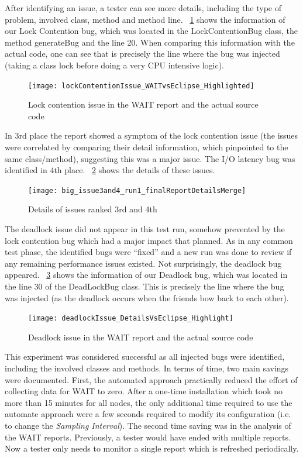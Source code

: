 \documentclass[runningheads,a4paper]{llncs}
\begin{document}
After identifying an issue, a tester can see more details, including the type of
problem, involved class, method and method line. \figurename
~\ref{fig_issue2_vs_code} shows the information of our Lock Contention bug,
which was located in the LockContentionBug class, the method generateBug and the
line 20. When comparing this information with the actual code, one can see that
is precisely the line where the bug was injected (taking a class lock before
doing a very CPU intensive logic).

\begin{figure}[!h]
\centering
\texttt{[image: lockContentionIssue\_WAITvsEclipse\_Highlighted]}
\caption{Lock contention issue in the WAIT report and the actual source code}
\label{fig_issue2_vs_code}
\end{figure}

In 3rd place the report showed a symptom of the lock contention issue
(the issues were correlated by comparing their detail information, which
pinpointed to the same class/method), suggesting this was a major issue. The I/O
latency bug was identified in 4th place. \figurename ~\ref{fig_issues34} shows
the details of these issues.

\begin{figure}[!h]
\centering
\texttt{[image: big\_issue3and4\_run1\_finalReportDetailsMerge]}
\caption{Details of issues ranked 3rd and 4th}
\label{fig_issues34}
\end{figure}

The deadlock issue did not appear in this test run, somehow prevented by the
lock contention bug which had a major impact that planned. As in any common
test phase, the identified bugs were ``fixed'' and a new run was done to review
if any remaining performance issues existed. Not surprisingly, the deadlock bug
appeared. \figurename ~\ref{fig_dlissue_vs_code} shows the information of our
Deadlock bug, which was located in the line 30 of the DeadLockBug class. This is
precisely the line where the bug was injected (as the deadlock occurs when the
friends bow back to each other).
\vspace{-5pt}
\begin{figure}[!h]
\centering
\texttt{[image: deadlockIssue\_DetailsVsEclipse\_Highlight]}
\caption{Deadlock issue in the WAIT report and the actual source code}
\label{fig_dlissue_vs_code}
\end{figure}
\vspace{-5pt}

This experiment was considered successful as all injected bugs were identified,
including the involved classes and methods. In terms of time, two main savings
were documented. First, the automated approach practically reduced the effort of
collecting data for WAIT to zero. After a one-time installation which took no
more than 15 minutes for all nodes, the only additional time required to use 
the automate approach were a few seconds required to modify its configuration
(i.e. to change the \emph{Sampling Interval}). The second time saving was in the
analysis of the WAIT reports. Previously, a tester would have ended with
multiple reports. Now a tester only needs to monitor a single report which is 
refreshed periodically.
\end{document}

